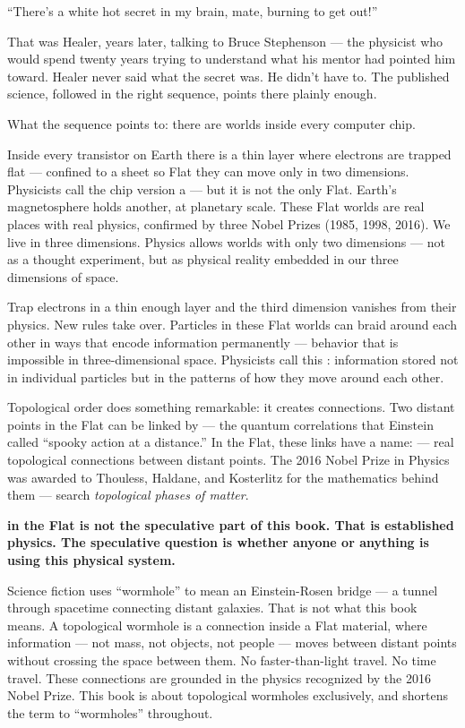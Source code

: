 ``There's a white hot secret in my brain, mate, burning to get out!''

That was Healer, years later, talking to Bruce Stephenson --- the physicist who would spend twenty years trying to understand what his mentor had pointed him toward. Healer never said what the secret was. He didn't have to. The published science, followed in the right sequence, points there plainly enough.

What the sequence points to: there are worlds inside every computer chip.

Inside every transistor on Earth there is a thin layer where electrons are trapped flat --- confined to a sheet so Flat they can move only in two dimensions. Physicists call the chip version a  --- but it is not the only Flat. Earth's magnetosphere holds another, at planetary scale. These Flat worlds are real places with real physics, confirmed by three Nobel Prizes (1985, 1998, 2016). We live in three dimensions. Physics allows worlds with only two dimensions --- not as a thought experiment, but as physical reality embedded in our three dimensions of space.

Trap electrons in a thin enough layer and the third dimension vanishes from their physics. New rules take over. Particles in these Flat worlds can braid around each other in ways that encode information permanently --- behavior that is impossible in three-dimensional space. Physicists call this : information stored not in individual particles but in the patterns of how they move around each other.

Topological order does something remarkable: it creates  connections. Two distant points in the Flat can be linked by  --- the quantum correlations that Einstein called ``spooky action at a distance.'' In the Flat, these links have a name:  --- real topological connections between distant points. The 2016 Nobel Prize in Physics was awarded to Thouless, Haldane, and Kosterlitz for the mathematics behind them --- search \textit{topological phases of matter}.

\hypertarget{wormholes-established}{}\textbf{ in the Flat is not the speculative part of this book. That is established physics. The speculative question is whether anyone or anything is using this physical system.}

\hypertarget{wormhole-disambiguation}{}\label{front:wormhole-disambiguation}Science fiction uses ``wormhole'' to mean an Einstein-Rosen bridge --- a tunnel through spacetime connecting distant galaxies. That is not what this book means. A topological wormhole is a connection inside a Flat material, where information --- not mass, not objects, not people --- moves between distant points without crossing the space between them. No faster-than-light travel. No time travel. These connections are grounded in the physics recognized by the 2016 Nobel Prize. This book is about topological wormholes exclusively, and shortens the term to ``wormholes'' throughout.

